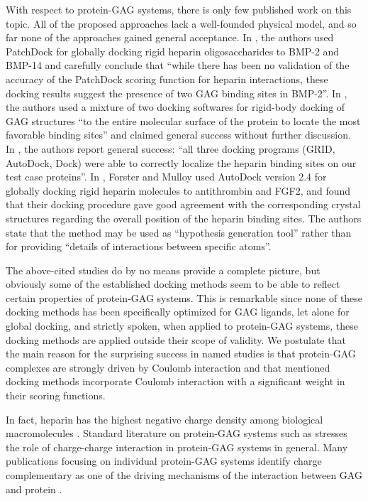 With respect to protein-GAG systems, there is only few published work on this
topic. All of the proposed approaches lack a well-founded physical model, and
so far none of the approaches gained general acceptance. In
\cite{gandhi_bmp_heparin_binding_sites_2012}, the authors used PatchDock
\cite{patchdock_2002} for globally docking rigid heparin oligosaccharides to
BMP-2 and BMP-14 and carefully conclude that \enquote{while there has been no
validation of the accuracy of the PatchDock scoring function for heparin
interactions, these docking results suggest the presence of two GAG binding
sites in BMP-2}. In \cite{rogers_gag_prot_prot_2011}, the authors used a mixture
of two docking softwares for rigid-body docking of GAG structures \enquote{to
the entire molecular surface of the protein to locate the most favorable binding
sites} and claimed general success without further discussion. In
\cite{bitomsky_gag_docking_1999}, the authors report general success:
\enquote{all three docking programs (GRID, AutoDock, Dock) were able to
correctly localize the heparin binding sites on our test case proteins}. In
\cite{hp_binding_sites_mulloy_2006}, Forster and Mulloy used AutoDock version
2.4 \cite{autodock24} for globally docking rigid heparin molecules to
antithrombin and FGF2, and found that their docking procedure gave good
agreement with the corresponding crystal structures regarding the overall
position of the heparin binding sites. The authors state that the method may be
used as \enquote{hypothesis generation tool} rather than for providing
\enquote{details of interactions between specific atoms}.

The above-cited studies do by no means provide a complete picture, but obviously
some of the established docking methods seem to be able to reflect certain
properties of protein-GAG systems. This is remarkable since none of these
docking methods has been specifically optimized for GAG ligands, let alone for
global docking, and strictly spoken, when applied to protein-GAG systems, these
docking methods are applied outside their scope of validity. We postulate that
the main reason for the surprising success in named studies is that protein-GAG
complexes are strongly driven by Coulomb interaction and that mentioned docking
methods incorporate Coulomb interaction with a significant weight in their
scoring functions.

In fact, heparin has the highest negative charge density among biological
macromolecules \cite{capila_linhardt_hep_prot_2002}. Standard literature on
protein-GAG systems such as
\cite{essentials_glycobiology_gags_2009,gandhi_structure_2008} stresses the
role of charge-charge interaction in protein-GAG systems in general. Many
publications focusing on individual protein-GAG systems identify charge
complementary as one of the driving mechanisms of the interaction between GAG
and protein
\cite{gandhi_bmp_heparin_binding_sites_2012,faham_heparin_1996,%
pichert_characterization_2012,rogers_gag_prot_prot_2011}.

